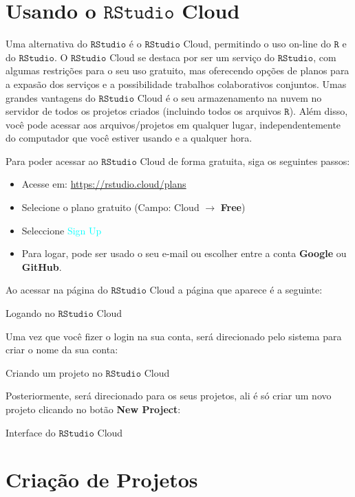 \documentclass[
]{book}
\begin{document}
\hypertarget{usando-o-textttrstudio-cloud}{%
\section{\texorpdfstring{Usando o \(\texttt{RStudio}\) Cloud}{Usando o \textbackslash texttt\{RStudio\} Cloud}}\label{usando-o-textttrstudio-cloud}}

Uma alternativa do \(\texttt{RStudio}\) é o \(\texttt{RStudio}\) Cloud, permitindo o uso on-line do \(\texttt{R}\) e do \(\texttt{RStudio}\). O \(\texttt{RStudio}\) Cloud se destaca por ser um serviço do \(\texttt{RStudio}\), com algumas restrições para o seu uso gratuito, mas oferecendo opções de planos para a expasão dos serviços e a possibilidade trabalhos colaborativos conjuntos. Umas grandes vantagens do \(\texttt{RStudio}\) Cloud é o seu armazenamento na nuvem no servidor de todos os projetos criados (incluindo todos os arquivos \(\texttt{R}\)). Além disso, você pode acessar aos arquivos/projetos em qualquer lugar, independentemente do computador que você estiver usando e a qualquer hora.

Para poder acessar ao \(\texttt{RStudio}\) Cloud de forma gratuita, siga os seguintes passos:

\begin{itemize}
\item
  Acesse em: \url{https://rstudio.cloud/plans}
\item
  Selecione o plano gratuito (Campo: Cloud \(\rightarrow\) \textbf{Free})
\item
  Seleccione \textcolor{cyan}{Sign Up}
\item
  Para logar, pode ser usado o seu e-mail ou escolher entre a conta \textbf{Google} ou \textbf{GitHub}.
\end{itemize}

Ao acessar na página do \(\texttt{RStudio}\) Cloud a página que aparece é a seguinte:

Logando no \(\texttt{RStudio}\) Cloud

Uma vez que você fizer o login na sua conta, será direcionado pelo sistema para criar o nome da sua conta:

Criando um projeto no \(\texttt{RStudio}\) Cloud

Posteriormente, será direcionado para os seus projetos, ali é só criar um novo projeto clicando no botão \textbf{New Project}:

Interface do \(\texttt{RStudio}\) Cloud

\hypertarget{criauxe7uxe3o-de-projetos}{%
\section{Criação de Projetos}\label{criauxe7uxe3o-de-projetos}}
\end{document}
